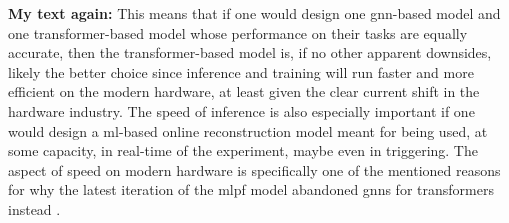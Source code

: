 \textbf{My text again:} This means that if one would design one \gls{gnn}-based model and one transformer-based model whose performance on their tasks are equally accurate, then the transformer-based model is, if no other apparent downsides, likely the better choice since inference and training will run faster and more efficient on the modern hardware, at least given the clear current shift in the hardware industry. The speed of inference is also especially important if one would design a \gls{ml}-based online reconstruction model meant for being used, at some capacity, in real-time of the experiment, maybe even in triggering. The aspect of speed on modern hardware is specifically one of the mentioned reasons for why the latest iteration of the \gls{mlpf} model abandoned \gls{gnn}s for transformers instead \cite{pata2026-mlpf}. 







